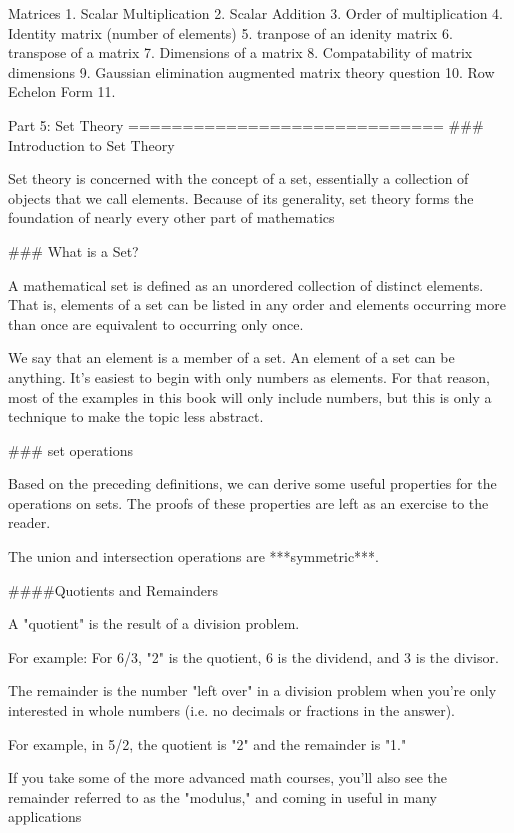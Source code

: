 Matrices
1. Scalar Multiplication
2. Scalar Addition
3. Order of multiplication
4. Identity matrix (number of elements)
5. tranpose of an idenity matrix
6. transpose of a matrix
7. Dimensions of a matrix
8. Compatability of matrix dimensions
9. Gaussian elimination augmented matrix theory question
10. Row Echelon Form
11. 


Part 5: Set Theory
=============================
### Introduction to Set Theory

Set theory is concerned with the concept of a set, essentially a collection of objects that we call elements. 
Because of its generality, set theory forms the foundation of nearly every other part of mathematics

### What is a Set?

A mathematical set is defined as an unordered collection of distinct elements. That is, elements of a set can be listed in any order and elements occurring more than once are equivalent to occurring only once.
 
We say that an element is a member of a set. An element of a set can be anything. It's easiest to begin with only numbers as elements. For that reason, most of the examples in this book will only include numbers, but this is only a technique to make the topic less abstract.

### set operations

Based on the preceding definitions, we can derive some useful properties for the operations on sets. The proofs of these properties are left as an exercise to the reader.
 
The union and intersection operations are ***symmetric***. 



####Quotients and Remainders

A "quotient" is the result of a division problem. 

For example: For 6/3, "2" is the quotient, 6 is the dividend, and 3 is the divisor. 

The remainder is the number "left over" in a division problem when you're only interested in whole numbers 
(i.e. no decimals or fractions in the answer). 

For example, in 5/2, the quotient is "2" and the remainder is "1." 

If you take some of the more advanced math courses, you'll also see the remainder referred to as the "modulus," 
and coming in useful in many applications



